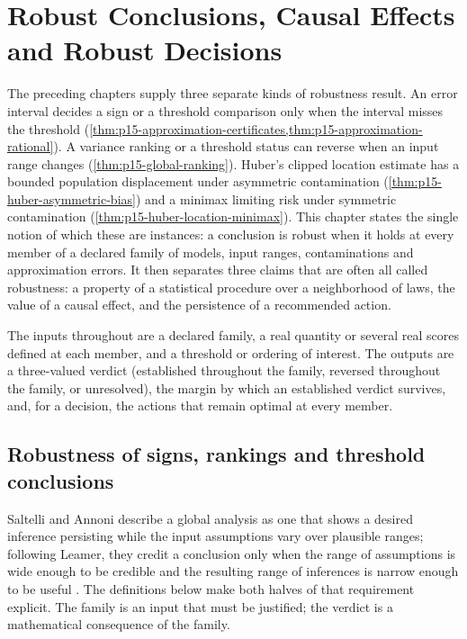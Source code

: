\chapter{Robust Conclusions, Causal Effects and Robust Decisions}
\label{sec:p15-w02b-p15-070}

The preceding chapters supply three separate kinds of robustness result.
An error interval decides a sign or a threshold comparison only when the
interval misses the threshold
(\cref{thm:p15-approximation-certificates,thm:p15-approximation-rational}).
A variance ranking or a threshold status can reverse when an input range
changes (\cref{thm:p15-global-ranking}). Huber's clipped location estimate
has a bounded population displacement under asymmetric contamination
(\cref{thm:p15-huber-asymmetric-bias}) and a minimax limiting risk under
symmetric contamination (\cref{thm:p15-huber-location-minimax}).
This chapter states the single notion of which these are instances: a
conclusion is robust when it holds at every member of a declared family of
models, input ranges, contaminations and approximation errors.
It then separates three claims that are often all called robustness:
a property of a statistical procedure over a neighborhood of laws, the value
of a causal effect, and the persistence of a recommended action.

The inputs throughout are a declared family, a real quantity or several
real scores defined at each member, and a threshold or ordering of interest.
The outputs are a three-valued verdict (established throughout the family,
reversed throughout the family, or unresolved), the margin by which an
established verdict survives, and, for a decision, the actions that remain
optimal at every member.

\section{Robustness of signs, rankings and threshold conclusions}
\label{sec:p15-w02b-p15-070-signs}

Saltelli and Annoni describe a global analysis as one that shows a desired
inference persisting while the input assumptions vary over plausible
ranges; following Leamer, they credit a conclusion only when the range of
assumptions is wide enough to be credible and the resulting range of
inferences is narrow enough to be useful
\cite[Sec.~2, p.~1509]{SaltelliAnnoni2010Sensitivity}.
The definitions below make both halves of that requirement explicit.
The family is an input that must be justified; the verdict is a
mathematical consequence of the family.

